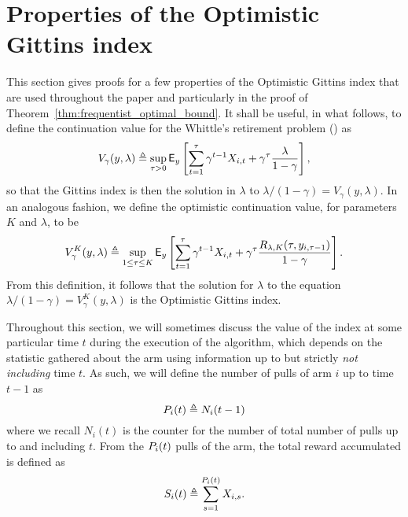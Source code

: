 \section{Properties of the Optimistic Gittins index}\label{sec:appendix_properties_of_ogi}
This section gives proofs for a few properties of the Optimistic Gittins index that are used throughout the paper and particularly in the proof of Theorem~\ref{thm:frequentist_optimal_bound}.  
It shall be useful, in what follows, to define the continuation value for the Whittle's retirement problem (\cite{whittle1980multi}) as
\[
V_\gamma(y, \lambda)  \triangleq \sup_{\tau > 0} \mathsf{E}_y\left[\sum_{t=1}^{\tau} \gamma^{t-1} X_{i,t} + \gamma^{\tau} \frac{\lambda}{1-\gamma}\right],
\]
so that the Gittins index is then the solution in $\lambda$ to $\lambda/(1-\gamma) = V_\gamma(y, \lambda)$. In an analogous fashion, we define the optimistic continuation value, for parameters $K$ and $\lambda$, to be
\[
V^K_\gamma(y, \lambda) \triangleq \sup_{1 \le \tau \le K} \mathsf{E}_y\left[\sum_{t=1}^{\tau} \gamma^{t-1}  X_{i,t} + \gamma^{\tau} \frac{R_{\lambda, K}(\tau, y_{i,\tau-1})}{1-\gamma}\right].
\]
From this definition, it follows that the solution for $\lambda$ to the equation $\lambda/(1-\gamma) = V^K_\gamma(y, \lambda)$ is the Optimistic Gittins index.

Throughout this section, we will sometimes discuss the value of the index at some particular time $t$ during the execution of the algorithm, which depends on the statistic gathered about the arm using information up to but strictly \emph{not including} time $t$. As such, we will define the number of pulls of arm $i$ up to time $t-1$ as
\[
P_{i}(t) \triangleq N_i(t-1)
\]
where we recall $N_i(t)$ is the counter for the number of total number of pulls up to and including $t$. From the $P_{i}(t)$ pulls of the arm, the total reward accumulated is defined as
\[
S_i(t) \triangleq \sum_{s=1}^{P_{i}(t)} X_{i,s}.
\]


